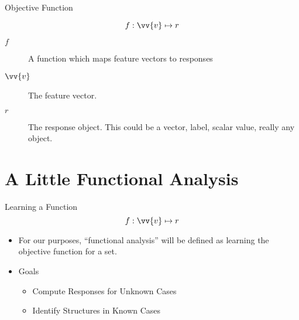 \documentclass[handout]{beamer}
\begin{document}
\begin{frame}{Objective Function}
    \begin{center}
    \begin{adjustbox}{height=0.1\textheight}
    \[
    f : \vv{v} \mapsto r
    \]
    \end{adjustbox}
    \end{center}
    \begin{description}
        \item[$f$] A function which maps feature vectors to responses
        \item[$\vv{v}$] The feature vector.
        \item[$r$] The response object. This could be a vector, label, scalar value, really any object.
    \end{description}
\end{frame}

\section{A Little Functional Analysis}

\begin{frame}{Learning a Function}
    \[
    f : \vv{v} \mapsto r
    \]
    \begin{itemize}
        \item For our purposes, ``functional analysis'' will be defined as learning the objective function for a set.
        \item Goals
        \begin{itemize}
            \item Compute Responses for Unknown Cases
            \item Identify Structures in Known Cases
        \end{itemize}
    \end{itemize}
\end{frame}
\end{document}
